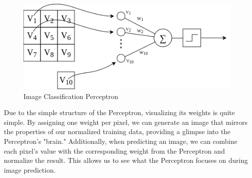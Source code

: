 \documentclass{article}
\begin{document}
\begin{figure}[ht]
    \centering
    \includegraphics[width=0.75\linewidth]{assets/perceptron/perceptron-image-classification.png}
    \caption*{Image Classification Perceptron}
    \label{fig:perceptron-image-classification}
\end{figure}

Due to the simple structure of the Perceptron, visualizing its weights is quite simple. By assigning one weight per pixel, we can generate an image that mirrors the properties of our normalized training data, providing a glimpse into the Perceptron's "brain." Additionally, when predicting an image, we can combine each pixel's value with the corresponding weight from the Perceptron and normalize the result. This allows us to see what the Perceptron focuses on during image prediction.
\end{document}
